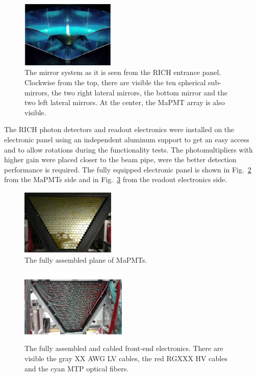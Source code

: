 \documentclass[5p,times,twocolumn]{elsarticle}
\def\MaPMT{MaPMT }
\begin{document}
\begin{figure}
\begin{center}
\includegraphics[width=0.4\textwidth]{mirrors.pdf}
\caption{The mirror system as it is seen from the RICH entrance panel. Clockwise from the top, there are visible the ten spherical sub-mirrors, the two right lateral mirrors, the bottom mirror and the two left lateral mirrors. At the center, the \MaPMT array is also visible.}
\label{fig:mirrors}
\end{center}
\end{figure}


The RICH photon detectors and readout electronics were installed on the electronic panel using an independent aluminum support to get an easy access and to allow rotations during the functionality tests. The photomultipliers with higher gain were placed closer to the beam pipe, were the better detection performance is required. The fully equipped electronic panel is shown in Fig.~\ref{fig:MaPMTs} from the MaPMTs side and in Fig.~\ref{fig:electronics} from the readout electronics side.

\begin{figure}
\begin{center}
\includegraphics[width=0.4\textwidth]{MaPMT.pdf}
\caption{The fully assembled plane of MaPMTs.}
\label{fig:MaPMTs}
\end{center}
\end{figure}

\begin{figure}
\begin{center}
\includegraphics[width=0.45\textwidth]{electronics.pdf}
\caption{The fully assembled and cabled front-end electronics. There are visible the gray XX AWG LV cables, the red RGXXX HV cables and the cyan MTP optical fibers.}
\label{fig:electronics}
\end{center}
\end{figure}
\end{document}
